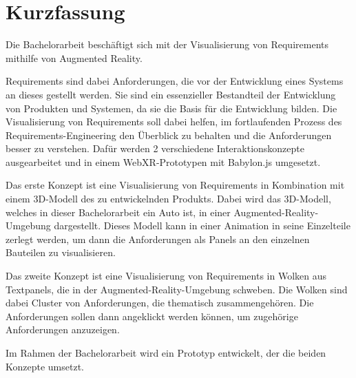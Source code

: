 \chapter{Kurzfassung}

Die Bachelorarbeit beschäftigt sich mit der Visualisierung von Requirements mithilfe von Augmented Reality.

Requirements sind dabei Anforderungen, die vor der Entwicklung eines Systems an dieses gestellt werden.
Sie sind ein essenzieller Bestandteil der Entwicklung von Produkten und Systemen, da sie die Basis für die Entwicklung bilden.
Die Visualisierung von Requirements soll dabei helfen, im fortlaufenden Prozess des Requirements-Engineering den Überblick zu behalten und die Anforderungen besser zu verstehen.
Dafür werden 2 verschiedene Interaktionskonzepte ausgearbeitet und in einem WebXR-Prototypen mit Babylon.js umgesetzt.

Das erste Konzept ist eine Visualisierung von Requirements in Kombination mit einem 3D-Modell des zu entwickelnden Produkts.
Dabei wird das 3D-Modell, welches in dieser Bachelorarbeit ein Auto ist, in einer Augmented-Reality-Umgebung dargestellt.
Dieses Modell kann in einer Animation in seine Einzelteile zerlegt werden, um dann die Anforderungen als Panels an den einzelnen Bauteilen zu visualisieren.

Das zweite Konzept ist eine Visualisierung von Requirements in Wolken aus Textpanels, die in der Augmented-Reality-Umgebung schweben.
Die Wolken sind dabei Cluster von Anforderungen, die thematisch zusammengehören.
Die Anforderungen sollen dann angeklickt werden können, um zugehörige Anforderungen anzuzeigen.


Im Rahmen der Bachelorarbeit wird ein Prototyp entwickelt, der die beiden Konzepte umsetzt.